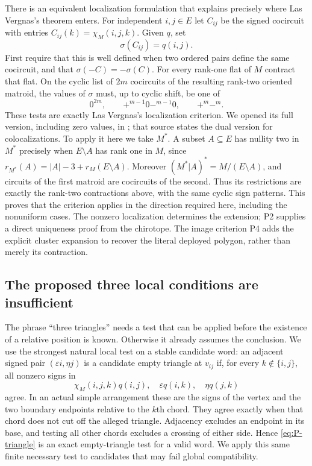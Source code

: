 There is an equivalent localization formulation that explains precisely
where Las Vergnas's theorem enters.  For independent $i,j\in E$ let
$C_{ij}$ be the signed cocircuit with entries
$C_{ij}(k)=\chi_M(i,j,k)$.  Given $q$, set
\begin{equation}
               \sigma(C_{ij})=q(i,j).                    \label{eq:P-sigma}
\end{equation}
First require that this is well defined when two ordered pairs define
the same cocircuit, and that $\sigma(-C)=-\sigma(C)$.
For every rank-one flat of $M$ contract that flat.  On the cyclic list
of $2m$ cocircuits of the resulting rank-two oriented matroid, the
values of $\sigma$ must, up to cyclic shift, be one of
\[
 0^{2m},\qquad +^{m-1}0-^{m-1}0,\qquad +^{m}-^{m}.
\]
These tests are exactly Las Vergnas's localization criterion.  We
opened its full version, including zero values, in
\cite[Definition~6.4 and Theorem~6.5, p.~25]{GP2021}; that source states
the dual version for colocalizations.  To apply it here we take $M^*$.
A subset $A\subseteq E$ has nullity two in $M^*$ precisely when
$E\setminus A$ has rank one in $M$, since
$r_{M^*}(A)=|A|-3+r_M(E\setminus A)$.  Moreover
$(M^*|A)^*=M/(E\setminus A)$, and circuits of the first matroid are
cocircuits of the second.  Thus its restrictions are exactly the
rank-two contractions above, with the same cyclic sign patterns.
This proves that the criterion applies in the direction required here,
including the nonuniform cases.  The nonzero localization determines
the extension; P2 supplies a direct uniqueness proof from the
chirotope.  The image criterion P4 adds the explicit cluster expansion
to recover the literal deployed polygon, rather than merely its
contraction.

\subsection{The proposed three local conditions are insufficient}

The phrase ``three triangles'' needs a test that can be applied before
the existence of a relative position is known.  Otherwise it already
assumes the conclusion.  We use the strongest natural local test on a
stable candidate word: an adjacent signed pair
$(\varepsilon i,\eta j)$ is a candidate empty triangle at $v_{ij}$ if,
for every $k\notin\{i,j\}$, all nonzero signs in
\begin{equation}
 \chi_M(i,j,k)q(i,j),\quad \varepsilon q(i,k),\quad
 \eta q(j,k)                                               \label{eq:P-triangle}
\end{equation}
agree.  In an actual simple arrangement these are the signs of the
vertex and the two boundary endpoints relative to the $k$th chord.
They agree exactly when that chord does not cut off the alleged
triangle.  Adjacency excludes an endpoint in its base, and testing all
other chords excludes a crossing of either side.  Hence
\eqref{eq:P-triangle} is an exact empty-triangle test for a valid word.
We apply this same finite necessary test to candidates that may fail
global compatibility.

